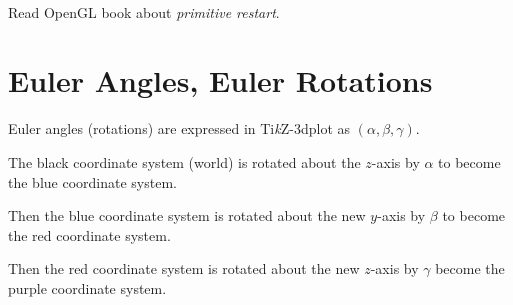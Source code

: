 \

Read OpenGL book about {\it primitive restart}.



\section{Euler Angles, Euler Rotations}

Euler angles (rotations) are expressed in Ti\textit{k}Z-3dplot as $(\alpha, \beta, \gamma)$.   

The black coordinate system (world) is rotated about the $z$-axis by $\alpha$ to become the blue coordinate system.  

Then the blue coordinate system is rotated about the new $y$-axis by $\beta$ to become the red coordinate system.

Then the red coordinate system is rotated about the new $z$-axis by $\gamma$ become the purple coordinate system.


